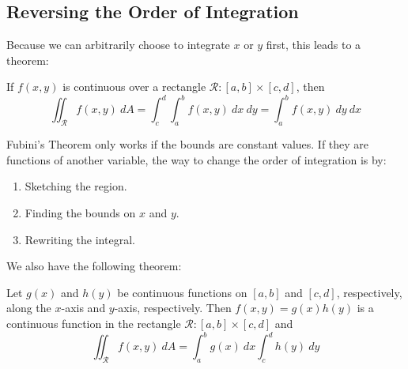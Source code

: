 \documentclass[12pt]{article}
\begin{document}
\subsection{Reversing the Order of Integration}
Because we can arbitrarily choose to integrate $x$ or $y$ first, this leads to a theorem:
\begin{theorem}
If $f(x,y)$ is continuous over a rectangle $\mathcal{R}: [a,b] \times [c,d]$, then \[ \iint_{\mathcal{R}} f(x,y) \ dA = \int_c^d\int_a^b f(x,y) \ dx \ dy = \int_a^b f(x,y) \ dy \ dx \]
\end{theorem}
Fubini's Theorem only works if the bounds are constant values. If they are functions of another variable, the way to change the order of integration is by:
\begin{enumerate}
\item Sketching the region.
\item Finding the bounds on $x$ and $y$.
\item Rewriting the integral.
\end{enumerate}
We also have the following theorem:
\begin{theorem}
Let $g(x)$ and $h(y)$ be continuous functions on $[a,b]$ and $[c,d]$, respectively, along the $x$-axis and $y$-axis, respectively. Then $f(x,y) = g(x)h(y)$ is a continuous function in the rectangle $\mathcal{R}: [a,b] \times [c,d]$ and \[ \iint_{\mathcal{R}} f(x,y) \ dA = \int_a^bg(x) \ dx \int_c^d h(y) \ dy \]
\end{theorem}
\end{document}
